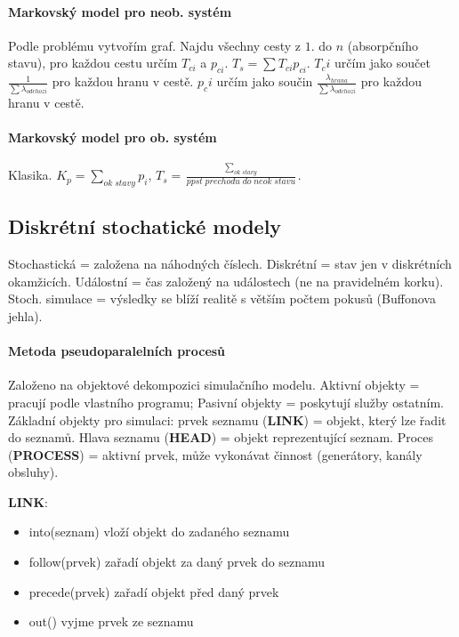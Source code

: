 \documentclass[11pt,a4paper]{scrartcl}
\begin{document}
	\paragraph{Markovský model pro neob. systém} Podle problému vytvořím graf. Najdu všechny cesty z $1.$ do $n$ (absorpčního stavu), pro každou cestu určím $T_{ci}$ a $p_{ci}$. $T_s = \sum T_{ci} p_{ci}$. $T_ci$ určím jako součet $\frac{1}{\sum \lambda_{odchozi}}$ pro každou hranu v cestě. $p_ci$ určím jako součin $\frac{\lambda_{hrana}}{\sum \lambda_{odchozi}}$ pro každou hranu v cestě.
	
	\paragraph{Markovský model pro ob. systém} Klasika. $K_p = \sum_{ok \; stavy} p_i$, $T_s = \frac{\sum_{ok \; stavy}}{ppst \; prechodu \; do \; neok \; stavu}$.
	
	
	\subsection{Diskrétní stochatické modely} Stochastická = založena na náhodných číslech. Diskrétní = stav jen v diskrétních okamžicích. Událostní = čas založený na událostech (ne na pravidelném korku). Stoch. simulace = výsledky se blíží realitě s větším počtem pokusů (Buffonova jehla).
	
	\paragraph{Metoda pseudoparalelních procesů} Založeno na objektové dekompozici simulačního modelu. Aktivní objekty = pracují podle vlastního programu; Pasivní objekty = poskytují služby ostatním. Základní objekty pro simulaci:  prvek seznamu (\textbf{LINK}) = objekt, který lze řadit do seznamů. Hlava seznamu (\textbf{HEAD}) = objekt reprezentující seznam. Proces (\textbf{PROCESS}) = aktivní prvek, může vykonávat činnost (generátory, kanály obsluhy).
	
	\textbf{LINK}:
	\begin{itemize}
		\item into(seznam) vloží objekt do zadaného seznamu
		\item follow(prvek) zařadí objekt za daný prvek do seznamu
		\item precede(prvek) zařadí objekt před daný prvek
		\item out() vyjme prvek ze seznamu
	\end{itemize}
\end{document}
